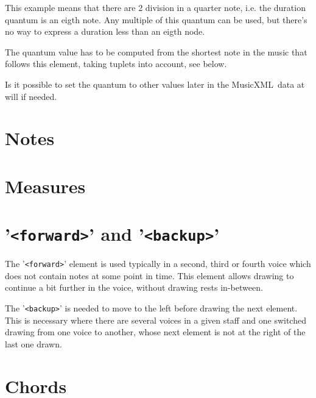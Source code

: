 \documentclass[12pt,a4paper]{article}
\newcommand{\mxml}{MusicXML}
\begin{document}
This example means that there are 2 division in a quarter note, i.e. the duration quantum is an eigth note. Any multiple of this quantum can be used, but there's no way to express a duration less than an eigth node.

The quantum value has to be computed from the shortest note in the music that follows this element, taking tuplets into account, see below. 

Is it possible to set the quantum to other values later in the \mxml\ data at will if needed.

\section{Notes}

\section{Measures}

\section{{'\tt <forward>}' and {'\tt <backup>}'}

The {'\tt <forward>}' element is used typically in a second, third or fourth voice which does not contain notes at some point in time. This element allows drawing to continue a bit further in the voice, without drawing rests in-between.

The {'\tt <backup>}' is needed to move to the left before drawing the next element. This is necessary where there are several voices in a given staff and one switched drawing from one voice to another, whose next element is not at the right of the last one drawn.

\section{Chords}
\end{document}
